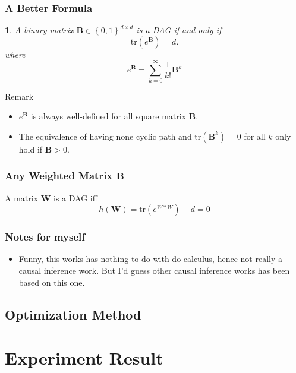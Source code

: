 \documentclass[10pt]{beamer}
\newcommand{\set}[1]{\left\{#1\right\}}
\newtheorem{proposition}[theorem]{\translate{Proposition}}
\begin{document}
\begin{frame}
    \frametitle{A Better Formula}

    \begin{proposition}
        A binary matrix $\bm{B} \in \set{0, 1}^{d \times d}$ is a DAG if and only if 
        \[
        \text{tr} (e^{\bm{B}}) = d.
        \] 
        where 
\[
e^{\bm{B}} = \sum^{\infty}_{k=0} \dfrac{1}{k!} \bm{B}^{k}
\] 

    \end{proposition}
    \begin{block}{Remark}
        \begin{itemize}
            \item $e^{\bm{B}}$ is always well-defined for all square matrix $\bm{B}$.
            \item The equivalence of having none cyclic path and $\text{tr}(\bm{B}^{k}) = 0$ for all $k$ only hold if $\bm{B}>0$.
        \end{itemize}
    \end{block}
\end{frame}

\begin{frame}
    \frametitle{Any Weighted Matrix $\bm{B}$}
    \begin{theorem}
        A matrix $\bm{W}$ is a DAG iff 
        \[
        h(\bm{W}) = \text{tr} \left( e^{W*W} \right) - d = 0
        \] 
    \end{theorem}
\end{frame}

\begin{frame}
    \frametitle{Notes for myself}
    \begin{itemize}
        \item Funny, this works has nothing to do with do-calculus, hence not really a causal inference work. But I'd guess other causal inference works has been based on this one.
    \end{itemize}
\end{frame}

\subsection{Optimization Method}%
\label{sub:optimization_method}


\section{Experiment Result}%
\label{sec:experiment_result}
\end{document}
